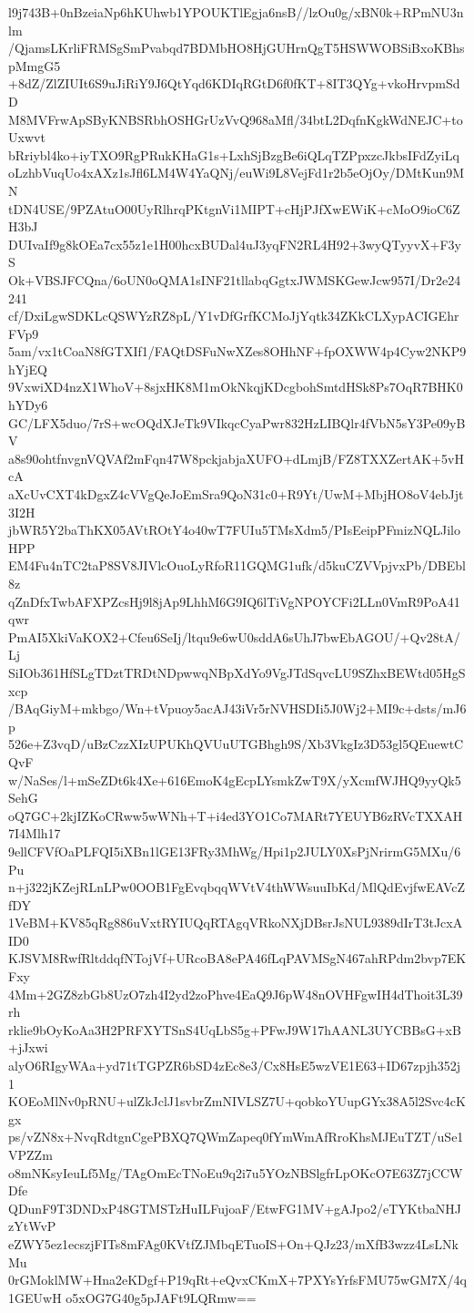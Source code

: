l9j743B+0nBzeiaNp6hKUhwb1YPOUKTlEgja6nsB//lzOu0g/xBN0k+RPmNU3nlm
/QjamsLKrliFRMSgSmPvabqd7BDMbHO8HjGUHrnQgT5HSWWOBSiBxoKBhspMmgG5
+8dZ/ZlZIUIt6S9uJiRiY9J6QtYqd6KDIqRGtD6f0fKT+8IT3QYg+vkoHrvpmSdD
M8MVFrwApSByKNBSRbhOSHGrUzVvQ968aMfl/34btL2DqfnKgkWdNEJC+toUxwvt
bRriybl4ko+iyTXO9RgPRukKHaG1s+LxhSjBzgBe6iQLqTZPpxzcJkbsIFdZyiLq
oLzhbVuqUo4xAXz1sJfl6LM4W4YaQNj/euWi9L8VejFd1r2b5eOjOy/DMtKun9MN
tDN4USE/9PZAtuO00UyRlhrqPKtgnVi1MIPT+cHjPJfXwEWiK+cMoO9ioC6ZH3bJ
DUIvaIf9g8kOEa7cx55z1e1H00hcxBUDal4uJ3yqFN2RL4H92+3wyQTyyvX+F3yS
Ok+VBSJFCQna/6oUN0oQMA1sINF21tllabqGgtxJWMSKGewJcw957I/Dr2e24241
cf/DxiLgwSDKLcQSWYzRZ8pL/Y1vDfGrfKCMoJjYqtk34ZKkCLXypACIGEhrFVp9
5am/vx1tCoaN8fGTXIf1/FAQtDSFuNwXZes8OHhNF+fpOXWW4p4Cyw2NKP9hYjEQ
9VxwiXD4nzX1WhoV+8sjxHK8M1mOkNkqjKDcgbohSmtdHSk8Ps7OqR7BHK0hYDy6
GC/LFX5duo/7rS+wcOQdXJeTk9VIkqcCyaPwr832HzLIBQlr4fVbN5sY3Pe09yBV
a8s90ohtfnvgnVQVAf2mFqn47W8pckjabjaXUFO+dLmjB/FZ8TXXZertAK+5vHcA
aXcUvCXT4kDgxZ4cVVgQeJoEmSra9QoN31c0+R9Yt/UwM+MbjHO8oV4ebJjt3I2H
jbWR5Y2baThKX05AVtROtY4o40wT7FUIu5TMsXdm5/PIsEeipPFmizNQLJiloHPP
EM4Fu4nTC2taP8SV8JIVlcOuoLyRfoR11GQMG1ufk/d5kuCZVVpjvxPb/DBEbl8z
qZnDfxTwbAFXPZcsHj9l8jAp9LhhM6G9IQ6lTiVgNPOYCFi2LLn0VmR9PoA41qwr
PmAI5XkiVaKOX2+Cfeu6SeIj/ltqu9e6wU0sddA6sUhJ7bwEbAGOU/+Qv28tA/Lj
SiIOb361HfSLgTDztTRDtNDpwwqNBpXdYo9VgJTdSqvcLU9SZhxBEWtd05HgSxcp
/BAqGiyM+mkbgo/Wn+tVpuoy5acAJ43iVr5rNVHSDIi5J0Wj2+MI9c+dsts/mJ6p
526e+Z3vqD/uBzCzzXIzUPUKhQVUuUTGBhgh9S/Xb3VkgIz3D53gl5QEuewtCQvF
w/NaSes/l+mSeZDt6k4Xe+616EmoK4gEcpLYsmkZwT9X/yXcmfWJHQ9yyQk5SehG
oQ7GC+2kjIZKoCRww5wWNh+T+i4ed3YO1Co7MARt7YEUYB6zRVcTXXAH7I4Mlh17
9ellCFVfOaPLFQI5iXBn1lGE13FRy3MhWg/Hpi1p2JULY0XsPjNrirmG5MXu/6Pu
n+j322jKZejRLnLPw0OOB1FgEvqbqqWVtV4thWWsuuIbKd/MlQdEvjfwEAVcZfDY
1VeBM+KV85qRg886uVxtRYIUQqRTAgqVRkoNXjDBsrJsNUL9389dIrT3tJcxAID0
KJSVM8RwfRltddqfNTojVf+URcoBA8ePA46fLqPAVMSgN467ahRPdm2bvp7EKFxy
4Mm+2GZ8zbGb8UzO7zh4I2yd2zoPhve4EaQ9J6pW48nOVHFgwIH4dThoit3L39rh
rklie9bOyKoAa3H2PRFXYTSnS4UqLbS5g+PFwJ9W17hAANL3UYCBBsG+xB+jJxwi
alyO6RIgyWAa+yd71tTGPZR6bSD4zEc8e3/Cx8HsE5wzVE1E63+ID67zpjh352j1
KOEoMlNv0pRNU+ulZkJclJ1svbrZmNIVLSZ7U+qobkoYUupGYx38A5l2Svc4cKgx
ps/vZN8x+NvqRdtgnCgePBXQ7QWmZapeq0fYmWmAfRroKhsMJEuTZT/uSe1VPZZm
o8mNKsyIeuLf5Mg/TAgOmEcTNoEu9q2i7u5YOzNBSlgfrLpOKcO7E63Z7jCCWDfe
QDunF9T3DNDxP48GTMSTzHuILFujoaF/EtwFG1MV+gAJpo2/eTYKtbaNHJzYtWvP
eZWY5ez1ecszjFITs8mFAg0KVtfZJMbqETuoIS+On+QJz23/mXfB3wzz4LsLNkMu
0rGMoklMW+Hna2eKDgf+P19qRt+eQvxCKmX+7PXYsYrfsFMU75wGM7X/4q1GEUwH
o5xOG7G40g5pJAFt9LQRmw==

